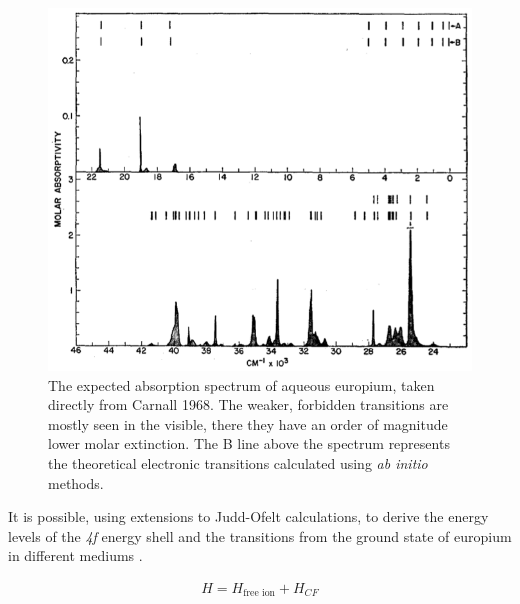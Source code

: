 \begin{figure}[t]
\begin{center}
\includegraphics[width=\textwidth]{figures/plots/eu_spec.png}
\end{center}
\caption[Aqueous Europium Spectrum from Literature]{The expected absorption spectrum of aqueous europium, taken directly from Carnall 1968\cite{Carnall:1968ch}. The weaker, forbidden transitions are mostly seen in the visible, there they have an order of magnitude lower molar extinction. The B line above the spectrum represents the theoretical electronic transitions calculated using \emph{ab initio} methods.}
\label{fig:eu_spec_theory}
\end{figure}

It is possible, using extensions to Judd-Ofelt calculations, to derive the
energy levels of the \textsl{4f} energy shell and the transitions from the
ground state of europium in different mediums
\cite{Carnall:1968ch,Carnall:1989fc,Richardson:1989vf,vanPieterson:2002hd}.

\begin{align}
  H = H_{\text{free ion}} + H_{CF} \label{eq:lan_ham}
\end{align}


